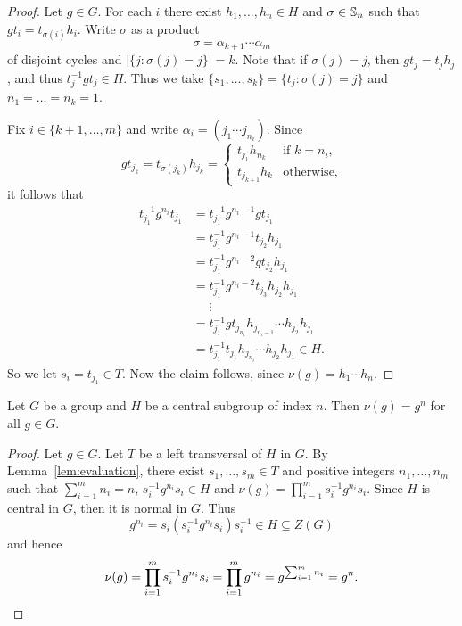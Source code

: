 \begin{proof}
	Let $g\in G$. For each $i$ there exist $h_1,\dots,h_n\in H$ and $\sigma\in\mathbb{S}_n$ such that 
	$gt_i=t_{\sigma(i)}h_i$. Write $\sigma$ as a product 
	\[
		\sigma=\alpha_{k+1}\cdots\alpha_m
	\]
	of disjoint cycles and $|\{ j :\sigma(j)=j\}|=k$. Note that if $\sigma(j)=j$, then $gt_j=t_jh_j$, and thus $t_j^{-1}gt_j\in H$. Thus we take $\{ s_1,\dots, s_k\}=\{ t_j :\sigma(j)=j\}$ and $n_1=\dots =n_k=1$.  

	Fix $i\in\{k+1,\dots,m\}$ and write  
	$\alpha_i=(j_{1}\cdots j_{n_i})$. Since  
	\[
		g t_{j_k}=t_{\sigma(j_k)}h_{j_k}=\begin{cases}
			t_{j_1}h_{n_k} & \text{if $k=n_i$},\\
			t_{j_{k+1}}h_{k} & \text{otherwise},
		\end{cases}
	\]
	it follows that 
	\begin{align*}
	t_{j_1}^{-1}g^{n_i}t_{j_1}
	&=t_{j_1}^{-1}g^{n_i-1}gt_{j_1}\\
	&=t_{j_1}^{-1}g^{n_i-1}t_{j_2}h_{j_1}\\
	&=t_{j_1}^{-1}g^{n_i-2}gt_{j_2}h_{j_1}\\
	&=t_{j_1}^{-1}g^{n_i-2}t_{j_3}h_{j_2}h_{j_1}\\
	&\phantom{=}\vdots\\
	&=t_{j_1}^{-1}gt_{j_{n_i}}h_{j_{n_{i}-1}}\cdots h_{j_2}h_{j_1}\\
	&=t_{j_1}^{-1}t_{j_1}h_{j_{n_i}}\cdots h_{j_2}h_{j_1}\in H. 	
	\end{align*}
	So we let $s_i=t_{j_1}\in T$. Now the claim follows, 
	since $\nu(g)=\bar h_1\cdots \bar h_{n}$.
\end{proof}

\begin{proposition}
	\label{prop:v(g)=g^n}
	Let $G$ be a group and $H$ be a central subgroup of index $n$. Then 
	$\nu(g)=g^n$ for all $g\in G$.
\end{proposition}

\begin{proof}
	Let $g\in G$. Let $T$ be a left transversal of $H$ in $G$. By Lemma~\ref{lem:evaluation}, there exist $s_1,\dots,s_m\in
	T$ and positive integers $n_1,\dots ,n_m$ such that $\sum_{i=1}^mn_i=n$, $s_i^{-1}g^{n_i}s_i\in H$ and $\nu(g)=\prod_{i=1}^m
	s_i^{-1}g^{n_i}s_i$.  Since $H$ is central in $G$, then it is normal in $G$. Thus 
	\[
	g^{n_i}=s_i(s_i^{-1}g^{n_i}s_i)s_i^{-1}\in H\subseteq Z(G)
	\]
	and hence  
	\[
		\nu(g)
		=\prod_{i=1}^m s_i^{-1}g^{n_i}s_i
		=\prod_{i=1}^m g^{n_i}
		=g^{\sum_{i=1}^m n_i}
		=g^n.\qedhere
	\]
\end{proof}
%

